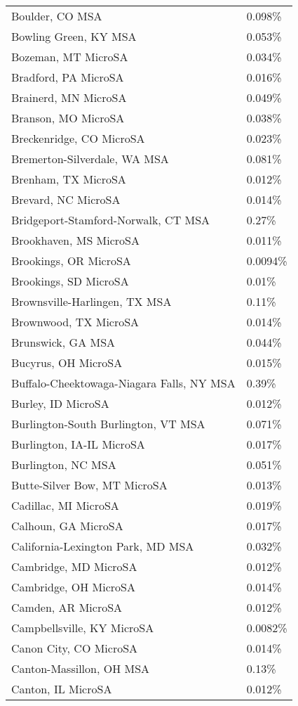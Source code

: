 \begin{longtable}[]{@{}ll@{}}
Boulder, CO MSA & 0.098\% \\
Bowling Green, KY MSA & 0.053\% \\
Bozeman, MT MicroSA & 0.034\% \\
Bradford, PA MicroSA & 0.016\% \\
Brainerd, MN MicroSA & 0.049\% \\
Branson, MO MicroSA & 0.038\% \\
Breckenridge, CO MicroSA & 0.023\% \\
Bremerton-Silverdale, WA MSA & 0.081\% \\
Brenham, TX MicroSA & 0.012\% \\
Brevard, NC MicroSA & 0.014\% \\
Bridgeport-Stamford-Norwalk, CT MSA & 0.27\% \\
Brookhaven, MS MicroSA & 0.011\% \\
Brookings, OR MicroSA & 0.0094\% \\
Brookings, SD MicroSA & 0.01\% \\
Brownsville-Harlingen, TX MSA & 0.11\% \\
Brownwood, TX MicroSA & 0.014\% \\
Brunswick, GA MSA & 0.044\% \\
Bucyrus, OH MicroSA & 0.015\% \\
Buffalo-Cheektowaga-Niagara Falls, NY MSA & 0.39\% \\
Burley, ID MicroSA & 0.012\% \\
Burlington-South Burlington, VT MSA & 0.071\% \\
Burlington, IA-IL MicroSA & 0.017\% \\
Burlington, NC MSA & 0.051\% \\
Butte-Silver Bow, MT MicroSA & 0.013\% \\
Cadillac, MI MicroSA & 0.019\% \\
Calhoun, GA MicroSA & 0.017\% \\
California-Lexington Park, MD MSA & 0.032\% \\
Cambridge, MD MicroSA & 0.012\% \\
Cambridge, OH MicroSA & 0.014\% \\
Camden, AR MicroSA & 0.012\% \\
Campbellsville, KY MicroSA & 0.0082\% \\
Canon City, CO MicroSA & 0.014\% \\
Canton-Massillon, OH MSA & 0.13\% \\
Canton, IL MicroSA & 0.012\% \\

\end{longtable}
